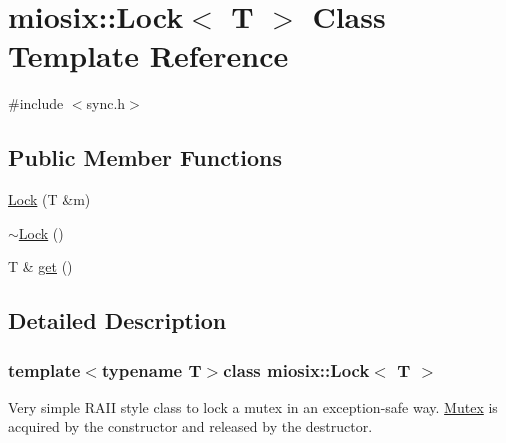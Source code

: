 \hypertarget{classmiosix_1_1_lock}{\section{miosix\-:\-:Lock$<$ T $>$ Class Template Reference}
\label{classmiosix_1_1_lock}
}


{\ttfamily \#include $<$sync.\-h$>$}

\subsection*{Public Member Functions}
\begin{DoxyCompactItemize}
\item 
\hyperlink{classmiosix_1_1_lock_aefcff605f9b21d592febe4c1bffa7807}{Lock} (T \&m)
\item 
\hyperlink{classmiosix_1_1_lock_ad8e9566c5eead737472fda2fce2a0c88}{$\sim$\-Lock} ()
\item 
T \& \hyperlink{classmiosix_1_1_lock_a28807e63ba20acd9df2b55bccf8af2bf}{get} ()
\end{DoxyCompactItemize}


\subsection{Detailed Description}
\subsubsection*{template$<$typename T$>$class miosix\-::\-Lock$<$ T $>$}

Very simple R\-A\-I\-I style class to lock a mutex in an exception-\/safe way. \hyperlink{classmiosix_1_1_mutex}{Mutex} is acquired by the constructor and released by the destructor. 


